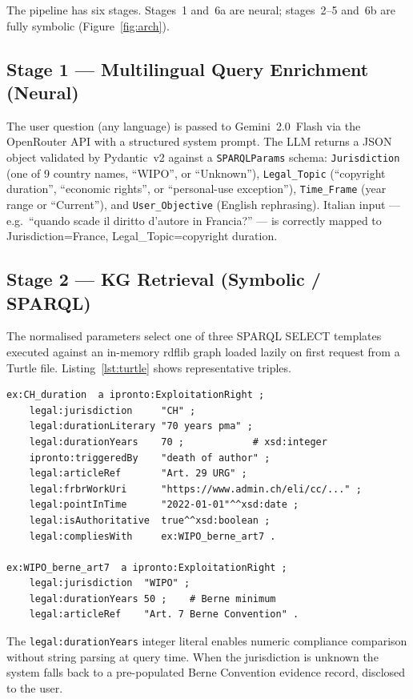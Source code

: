 \documentclass[12pt,a4paper]{article}
\begin{document}
The pipeline has six stages. Stages~1 and~6a are neural; stages~2--5
and~6b are fully symbolic (Figure~\ref{fig:arch}).

\subsection{Stage 1 --- Multilingual Query Enrichment (Neural)}

The user question (any language) is passed to Gemini~2.0~Flash via the
OpenRouter API with a structured system prompt. The LLM returns a JSON
object validated by Pydantic~v2 against a \texttt{SPARQLParams} schema:
\texttt{Jurisdiction} (one of 9 country names, ``WIPO'', or ``Unknown''),
\texttt{Legal\_Topic} (``copyright duration'', ``economic rights'', or
``personal-use exception''), \texttt{Time\_Frame} (year range or
``Current''), and \texttt{User\_Objective} (English rephrasing).
Italian input --- e.g.\ ``quando scade il diritto d'autore in Francia?''
--- is correctly mapped to Jurisdiction=France, Legal\_Topic=copyright
duration.

\subsection{Stage 2 --- KG Retrieval (Symbolic / SPARQL)}

The normalised parameters select one of three SPARQL SELECT templates
executed against an in-memory rdflib graph loaded lazily on first request
from a Turtle file. Listing~\ref{lst:turtle} shows representative triples.

\begin{lstlisting}[language=Turtle,label=lst:turtle,
  caption={Core KG triples for Swiss copyright duration (excerpt).}]
ex:CH_duration  a ipronto:ExploitationRight ;
    legal:jurisdiction     "CH" ;
    legal:durationLiterary "70 years pma" ;
    legal:durationYears    70 ;            # xsd:integer
    ipronto:triggeredBy    "death of author" ;
    legal:articleRef       "Art. 29 URG" ;
    legal:frbrWorkUri      "https://www.admin.ch/eli/cc/..." ;
    legal:pointInTime      "2022-01-01"^^xsd:date ;
    legal:isAuthoritative  true^^xsd:boolean ;
    legal:compliesWith     ex:WIPO_berne_art7 .

ex:WIPO_berne_art7  a ipronto:ExploitationRight ;
    legal:jurisdiction  "WIPO" ;
    legal:durationYears 50 ;    # Berne minimum
    legal:articleRef    "Art. 7 Berne Convention" .
\end{lstlisting}

The \texttt{legal:durationYears} integer literal enables numeric compliance
comparison without string parsing at query time. When the jurisdiction is
unknown the system falls back to a pre-populated Berne Convention evidence
record, disclosed to the user.
\end{document}
